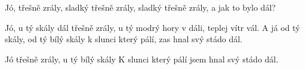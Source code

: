 \beginchorus{}
Jó, třešně zrály, sladký třešně zrály,
sladký třešně zrály, a jak to bylo dál?
\endchorus{}

\beginverse{}
Jó, u tý skály dál třešně zrály,
u tý modrý hory v dáli, teplej vítr vál.
A já od tý skály, od tý bílý skály
k slunci který pálí, zas hnal svý stádo dál.
\endverse{}

\beginchorus{}
Jó třešně zrály, u tý bílý skály
K slunci který pálí jsem hnal svý stádo dál.
\endchorus{}

\endsong{}
